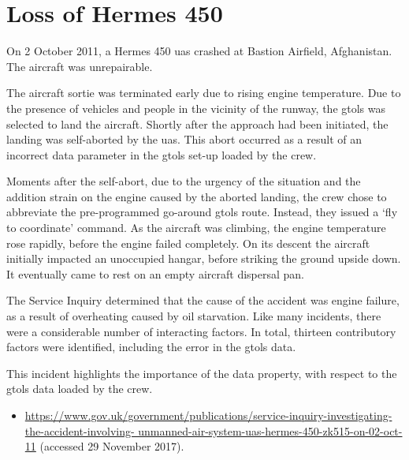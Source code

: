 \section{Loss of Hermes 450} \label{bkm:incacc:hermes450}
On 2 October 2011, a Hermes 450 \gls{uas} crashed at Bastion Airfield, Afghanistan. The aircraft was unrepairable.

The aircraft sortie was terminated early due to rising engine temperature. Due to the presence of vehicles and people in the vicinity of the runway, the \gls{gtols} was selected to land the aircraft. Shortly after the approach had been initiated, the landing was self-aborted by the \gls{uas}. This abort occurred as a result of an incorrect data parameter in the \gls{gtols} set-up loaded by the crew.

Moments after the self-abort, due to the urgency of the situation and the addition strain on the engine caused by the aborted landing, the crew chose to abbreviate the pre-programmed go-around \gls{gtols} route. Instead, they issued a `fly to coordinate' command. As the aircraft was climbing, the engine temperature rose rapidly, before the engine failed completely. On its descent the aircraft initially impacted an unoccupied hangar, before striking the ground upside down. It eventually came to rest on an empty aircraft dispersal pan.

The Service Inquiry determined that the cause of the accident was engine failure, as a result of overheating caused by oil starvation. Like many incidents, there were a considerable number of interacting factors. In total, thirteen contributory factors were identified, including the error in the \gls{gtols} data.

This incident highlights the importance of the  \gls{data property}, with respect to the \gls{gtols} data loaded by the crew.

\begin{samepage}
\begin{itemize}
	\item \raggedright{\href{https://www.gov.uk/government/publications/service-inquiry-investigating-the-accident-involving-unmanned-air-system-uas-hermes-450-zk515-on-02-oct-11}{https://www.gov.uk/government/publications/service-inquiry-investigating-the-accident-involving- unmanned-air-system-uas-hermes-450-zk515-on-02-oct-11} (accessed 29 November 2017).}
\end{itemize}
\end{samepage}



